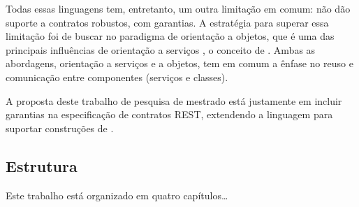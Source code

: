 Todas essas linguagens tem, entretanto, um outra limitação em comum: não dão
suporte a contratos robustos, com garantias. A estratégia para superar essa
limitação foi de buscar no paradigma de orientação a objetos, que é uma das
principais influências de orientação a serviços \cite{erl2009web},
o conceito de \designbycontract{}. Ambas as abordagens, orientação a serviços e
a objetos, tem em comum a ênfase no reuso e comunicação entre componentes
(serviços e classes).

A proposta deste trabalho de
pesquisa de mestrado está justamente em incluir garantias na especificação de
contratos REST, extendendo a linguagem \neoidl{} para suportar construções de
\designbycontract{}.



\subsection{Estrutura}
\vspace{-6mm}

Este trabalho está organizado em quatro capítulos\ldots


